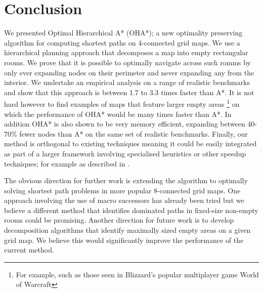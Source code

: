 \section{Conclusion}
We presented Optimal Hierarchical A* (OHA*); a new optimality preserving algorithm for 
computing shortest paths on 4-connected grid maps.
We use a hierarchical planning approach that decomposes a map into empty rectangular rooms.
We prove that it is possible to optimally navigate across such romms by only ever
expanding nodes on their perimeter and never expanding any from the interior.
We undertake an empirical analysis on a range of realistic benchmarks and show that
this approach is between 1.7 to 3.3 times faster than A*.
It is not hard however to find examples of maps that feature larger empty areas
\footnote{For example, such as those seen in Blizzard's popular multiplayer game World of Warcraft} 
on which the performance of OHA* would be many times faster than A*.
In addition OHA* is also shown to be very memory efficient,
expanding between 40-70\% fewer nodes than A* on the same set of realistic benchmarks.
Finally, our method is orthogonal to existing techniques meaning it could be easily integrated
as part of a larger framework involving specialised heuristics or other speedup techniques; 
for example as described in \cite{bjornsson05,bjornsson06}. 
\par
The obvious direction for further work is extending the algorithm to optimally solving 
shortest path problems in more popular 8-connected grid maps. 
One approach involving the use of macro successors has already been tried 
\cite{bolanca09} but we believe a different method that identifies 
dominated paths in fixed-size non-empty rooms could be promising. 
Another direction for future work is to develop decomposition algorithms that identify maximally
sized empty areas on a given grid map.
We believe this would significantly improve the performance of the current method.
